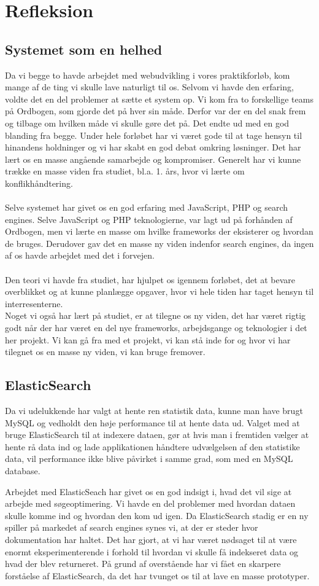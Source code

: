 \section{Refleksion}
\subsection{Systemet som en helhed}
Da vi begge to havde arbejdet med webudvikling i vores praktikforløb, kom mange af de ting vi skulle lave naturligt til os.
Selvom vi havde den erfaring, voldte det en del problemer at sætte et system op. Vi kom fra to forskellige teams på Ordbogen, som gjorde det på hver sin måde. Derfor var der en del snak frem og tilbage om hvilken måde vi skulle gøre det på. Det endte ud med en god blanding fra begge. Under hele forløbet har vi været gode til at tage hensyn til hinandens holdninger og vi har skabt en god debat omkring løsninger. Det har lært os en masse angående samarbejde og kompromiser. Generelt har vi kunne trække en masse viden fra studiet, bl.a. 1. års, hvor vi lærte om konflikhåndtering.
\\\\
Selve systemet har givet os en god erfaring med JavaScript, PHP og search engines. 
Selve JavaScript og PHP teknologierne, var lagt ud på forhånden af Ordbogen,
men vi lærte en masse om hvilke frameworks der eksisterer og hvordan de bruges.
Derudover gav det en masse ny viden indenfor search engines, da ingen af os havde arbejdet med det i forvejen.
\\\\
Den teori vi havde fra studiet, har hjulpet os igennem forløbet, det at bevare overblikket og at kunne planlægge opgaver, hvor vi hele tiden har taget hensyn til interresenterne.
\\
Noget vi også har lært på studiet, er at tilegne os ny viden, det har været rigtig godt når
der har været en del nye frameworks, arbejdsgange og teknologier i det her projekt.
Vi kan gå fra med et projekt, vi kan stå inde for og hvor vi har tilegnet os en masse ny viden, vi kan bruge fremover.
\subsection{ElasticSearch}
Da vi udelukkende har valgt at hente ren statistik data, kunne man have brugt MySQL og vedholdt den høje performance til at hente data ud. 
Valget med at bruge ElasticSearch til at indexere dataen, gør at hvis man i fremtiden vælger at hente rå data ind og lade applikationen håndtere
udvælgelsen af den statistike data, vil performance ikke blive påvirket i samme grad, som med en MySQL database.

Arbejdet med ElasticSeach har givet os en god indsigt i, hvad det vil sige at arbejde med søgeoptimering.
Vi havde en del problemer med hvordan dataen skulle komme ind og hvordan den kom ud igen. 
Da ElasticSearch stadig er en ny spiller på markedet af search engines synes vi, at der er steder hvor dokumentation har haltet.
Det har gjort, at vi har været nødsaget til at være enormt eksperimenterende i forhold til hvordan vi skulle få indekseret data og hvad der blev returneret.
På grund af overstående har vi fået en skarpere forståelse af ElasticSearch, da det har tvunget os til at lave en masse prototyper.
